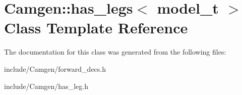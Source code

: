 \hypertarget{a00265}{}\section{Camgen\+:\+:has\+\_\+legs$<$ model\+\_\+t $>$ Class Template Reference}
\label{a00265}


The documentation for this class was generated from the following files\+:\begin{DoxyCompactItemize}
\item 
include/\+Camgen/forward\+\_\+decs.\+h\item 
include/\+Camgen/has\+\_\+leg.\+h\end{DoxyCompactItemize}
